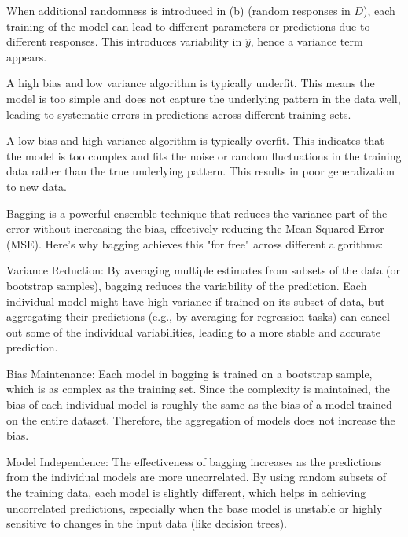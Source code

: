 \documentclass[12pt]{article}
\begin{document}
\begin{enumerate}
When additional randomness is introduced in (b) (random responses in \(D\)), each training of the model can lead to different parameters or predictions due to different responses. This introduces variability in \(\hat{y}\), hence a variance term appears.



A high bias and low variance algorithm is typically underfit. This means the model is too simple and does not capture the underlying pattern in the data well, leading to systematic errors in predictions across different training sets.


A low bias and high variance algorithm is typically overfit. This indicates that the model is too complex and fits the noise or random fluctuations in the training data rather than the true underlying pattern. This results in poor generalization to new data.


Bagging is a powerful ensemble technique that reduces the variance part of the error without increasing the bias, effectively reducing the Mean Squared Error (MSE). Here's why bagging achieves this "for free" across different algorithms:

Variance Reduction: By averaging multiple estimates from subsets of the data (or bootstrap samples), bagging reduces the variability of the prediction. Each individual model might have high variance if trained on its subset of data, but aggregating their predictions (e.g., by averaging for regression tasks) can cancel out some of the individual variabilities, leading to a more stable and accurate prediction.

Bias Maintenance: Each model in bagging is trained on a bootstrap sample, which is as complex as the training set. Since the complexity is maintained, the bias of each individual model is roughly the same as the bias of a model trained on the entire dataset. Therefore, the aggregation of models does not increase the bias.

Model Independence: The effectiveness of bagging increases as the predictions from the individual models are more uncorrelated. By using random subsets of the training data, each model is slightly different, which helps in achieving uncorrelated predictions, especially when the base model is unstable or highly sensitive to changes in the input data (like decision trees).



\end{enumerate}
\end{document}

